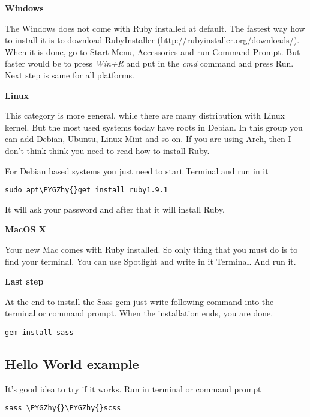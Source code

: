 \documentclass[a4paper,12pt,oneside]{sphinxmanual}
\def\PYGZhy{\char`\-}
\begin{document}
\textbf{Windows}

The Windows does not come with  Ruby installed at default. The fastest way how to install it is to download \href{http://rubyinstaller.org/downloads/}{RubyInstaller} (http://rubyinstaller.org/downloads/).
When it is done, go to Start Menu, Accessories and run Command Prompt. But faster would be to press \emph{Win+R} and put in the \emph{cmd} command and press Run. Next step is same for all platforms.

\textbf{Linux}

This category is more general, while there are many distribution with Linux kernel. But the most used systems today have roots in Debian. In this group you can add Debian, Ubuntu, Linux Mint and so on. If you are using Arch, then I don't think think you need to read how to install Ruby.

For Debian based systems you just need to start Terminal and run in it

\begin{Verbatim}[commandchars=\\\{\}]
sudo apt\PYGZhy{}get install ruby1.9.1
\end{Verbatim}

It will ask your password and after that it will install Ruby.

\textbf{MacOS X}

Your new Mac comes with Ruby installed. So only thing that you must do is to find your terminal. You can use Spotlight and write in it Terminal. And run it.

\textbf{Last step}

At the end to install the Sass gem just write following command into the terminal or command prompt. When the installation ends, you are done.

\begin{Verbatim}[commandchars=\\\{\}]
gem install sass
\end{Verbatim}


\subsection{Hello World example}
\label{src/sass:hello-world-example}
It's good idea to try if it works. Run in terminal or command prompt

\begin{Verbatim}[commandchars=\\\{\}]
sass \PYGZhy{}\PYGZhy{}scss
\end{Verbatim}
\end{document}
